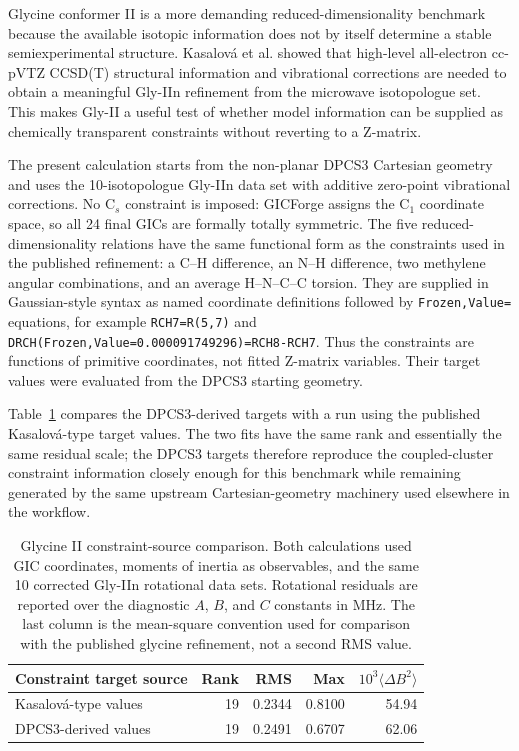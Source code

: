 \documentclass[journal=jctcce,manuscript=article,maxauthors=999]{achemso}
\begin{document}
Glycine conformer II is a more demanding reduced-dimensionality benchmark because the
available isotopic information does not by itself determine a stable
semiexperimental structure. Kasalov{\'a} et al. showed that high-level
all-electron cc-pVTZ CCSD(T) structural information and vibrational
corrections are needed to obtain a meaningful Gly-IIn refinement from the
microwave isotopologue set.\cite{Kasalova2007Glycine} This makes Gly-II a
useful test of whether model information can be supplied as chemically
transparent constraints without reverting to a Z-matrix.

The present calculation starts from the non-planar DPCS3 Cartesian geometry
and uses the 10-isotopologue Gly-IIn data set with additive zero-point
vibrational corrections. No C$_s$ constraint is imposed: GICForge assigns the
C$_1$ coordinate space, so all 24 final GICs are formally totally symmetric.
The five reduced-dimensionality relations have the same functional form as
the constraints used in the published refinement: a C--H difference, an N--H
difference, two methylene angular combinations, and an average H--N--C--C
torsion. They are supplied in Gaussian-style syntax as named coordinate
definitions followed by \texttt{Frozen,Value=} equations, for example
\texttt{RCH7=R(5,7)} and
\texttt{DRCH(Frozen,Value=0.000091749296)=RCH8-RCH7}. Thus the constraints are
functions of primitive coordinates, not fitted Z-matrix variables. Their
target values were evaluated from the DPCS3 starting geometry.

Table~\ref{tab:glycine-constraint-comparison} compares the DPCS3-derived
targets with a run using the published Kasalov{\'a}-type target values. The
two fits have the same rank and essentially the same residual scale; the
DPCS3 targets therefore reproduce the coupled-cluster constraint information
closely enough for this benchmark while remaining generated by the same
upstream Cartesian-geometry machinery used elsewhere in the workflow.

\begin{table}
\caption{Glycine II constraint-source comparison. Both calculations used GIC coordinates, moments of inertia as observables, and the same 10 corrected Gly-IIn rotational data sets. Rotational residuals are reported over the diagnostic $A$, $B$, and $C$ constants in MHz. The last column is the mean-square convention used for comparison with the published glycine refinement, not a second RMS value.}
\label{tab:glycine-constraint-comparison}
\begin{tabular}{lrrrr}
\toprule
Constraint target source & Rank & RMS & Max & $10^3\langle\Delta B^2\rangle$ \\
\midrule
Kasalov{\'a}-type values & 19 & 0.2344 & 0.8100 & 54.94 \\
DPCS3-derived values & 19 & 0.2491 & 0.6707 & 62.06 \\
\bottomrule
\end{tabular}
\end{table}
\end{document}
